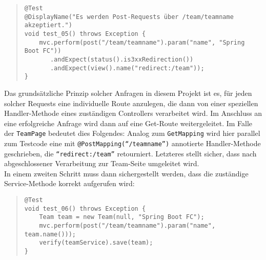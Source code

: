 \begin{quote}
\begin{verbatim}
@Test
@DisplayName("Es werden Post-Requests über /team/teamname akzeptiert.")
void test_05() throws Exception {
    mvc.perform(post("/team/teamname").param("name", "Spring Boot FC"))
       .andExpect(status().is3xxRedirection())
       .andExpect(view().name("redirect:/team"));
}
\end{verbatim}
\end{quote}

Das grundsätzliche Prinzip solcher Anfragen in diesem Projekt ist es, für jeden 
solcher Requests eine individuelle Route anzulegen, die dann von einer speziellen 
Handler-Methode eines zuständigen Controllers verarbeitet wird. Im Anschluss an 
eine erfolgreiche Anfrage wird dann auf eine Get-Route weitergeleitet. Im Falle der 
\texttt{TeamPage} bedeutet dies Folgendes: Analog zum \texttt{GetMapping} wird hier 
parallel zum Testcode eine mit \texttt{@PostMapping(``/teamname'')} annotierte 
Handler-Methode geschrieben, die \texttt{``redirect:/team''} retourniert. Letzteres 
stellt sicher, dass nach abgeschlossener Verarbeitung zur Team-Seite umgeleitet 
wird. \\ 
In einem zweiten Schritt muss dann sichergestellt werden, dass die zuständige 
Service-Methode korrekt aufgerufen wird: 

\begin{quote}
\begin{verbatim}
@Test
void test_06() throws Exception {
    Team team = new Team(null, "Spring Boot FC");
    mvc.perform(post("/team/teamname").param("name", team.name()));
    verify(teamService).save(team);
}
\end{verbatim}
\end{quote}

